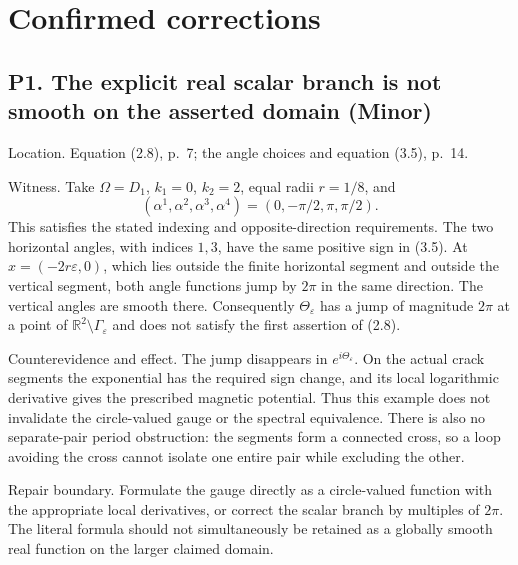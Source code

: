 \documentclass[10pt]{article}
\begin{document}
\section*{Confirmed corrections}
\subsection*{P1. The explicit real scalar branch is not smooth on the asserted domain (Minor)}
Location. Equation (2.8), p. 7; the angle choices and equation (3.5), p. 14.\par
Witness. Take \(\Omega=D_1\), \(k_1=0\), \(k_2=2\), equal radii \(r=1/8\), and \[(\alpha^1,\alpha^2,\alpha^3,\alpha^4)
       =(0,-\pi/2,\pi,\pi/2).\] This satisfies the stated indexing and opposite-direction requirements. The two horizontal angles, with indices \(1,3\), have the same positive sign in (3.5). At \(x=(-2r\varepsilon,0)\), which lies outside the finite horizontal segment and outside the vertical segment, both angle functions jump by \(2\pi\) in the same direction. The vertical angles are smooth there. Consequently \(\Theta_\varepsilon\) has a jump of magnitude \(2\pi\) at a point of \(\mathbb R^2\setminus\Gamma_\varepsilon\) and does not satisfy the first assertion of (2.8).\par
Counterevidence and effect. The jump disappears in \(e^{i\Theta_\varepsilon}\). On the actual crack segments the exponential has the required sign change, and its local logarithmic derivative gives the prescribed magnetic potential. Thus this example does not invalidate the circle-valued gauge or the spectral equivalence. There is also no separate-pair period obstruction: the segments form a connected cross, so a loop avoiding the cross cannot isolate one entire pair while excluding the other.\par
Repair boundary. Formulate the gauge directly as a circle-valued function with the appropriate local derivatives, or correct the scalar branch by multiples of \(2\pi\). The literal formula should not simultaneously be retained as a globally smooth real function on the larger claimed domain.\par
\end{document}
